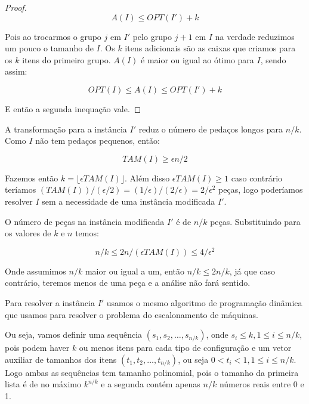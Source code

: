 \begin{proof}
\begin{equation}
A(I) \leq OPT(I') + k
\end{equation}

Pois ao trocarmos o grupo $j$ em $I'$ pelo grupo $j+1$ em $I$ na verdade reduzimos um pouco o tamanho de $I$. Os $k$ itens adicionais são as caixas que criamos para os $k$ itens do primeiro grupo. $A(I)$ é maior ou igual ao ótimo para $I$, sendo assim:

\begin{equation}
OPT(I) \leq A(I) \leq OPT(I') + k
\end{equation}

E então a segunda inequação vale.

\end{proof}

A transformação para a instância $I'$ reduz o número de pedaços longos para $n/k$. Como $I$ não tem pedaços pequenos, então:

\begin{equation}
TAM(I) \geq \epsilon n / 2
\end{equation}

Fazemos então $k = \lfloor \epsilon TAM(I) \rfloor$. Além disso $\epsilon TAM(I) \geq 1$ caso contrário teríamos $(TAM(I))/(\epsilon/2) = (1/\epsilon)/(2/\epsilon) = 2/\epsilon^2$ peças, logo poderíamos resolver $I$ sem a necessidade de uma instância modificada $I'$.

O número de peças na instância modificada $I'$ é de $n/k$ peças. Substituindo para os valores de $k$ e $n$ temos:

\begin{equation}
n/k \leq 2n/(\epsilon TAM(I)) \leq 4/\epsilon^2
\end{equation}

Onde assumimos $n/k$ maior ou igual a um, então $n/k \leq 2n/k$, já que caso contrário, teremos menos de uma peça e a análise não fará sentido.

Para resolver a instância $I'$ usamos o mesmo algoritmo de programação dinâmica que usamos para resolver o problema do escalonamento de máquinas.

Ou seja, vamos definir uma sequência $(s_1,s_2,\ldots,s_{n/k})$, onde $s_i \leq k, 1 \leq i \leq n/k$, pois podem haver $k$ ou menos itens para cada tipo de configuração e um vetor auxiliar de tamanhos dos itens $(t_1,t_2,\ldots,t_{n/k})$, ou seja $0 < t_i < 1, 1 \leq i \leq n/k$. Logo ambas as sequências tem tamanho polinomial, pois o tamanho da primeira lista é de no máximo $k^{n/k}$ e a segunda contém apenas $n/k$ números reais entre 0 e 1.

